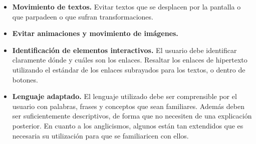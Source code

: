 \begin{itemize}
			\item \textbf{Movimiento de textos.} Evitar textos que se desplacen por la pantalla o que parpadeen o que sufran transformaciones.
			\item \textbf{Evitar animaciones y movimiento de imágenes.}
			\item \textbf{Identificación de elementos interactivos.} El usuario debe identificar claramente dónde y cuáles son los enlaces. Resaltar los enlaces de hipertexto utilizando el estándar de los enlaces subrayados para los textos, o dentro de botones.
			\item \textbf{Lenguaje adaptado.} El lenguaje utilizado debe ser comprensible por el usuario con palabras, frases y conceptos que sean familiares. Además deben ser suficientemente descriptivos, de forma que no necesiten de una explicación posterior. En cuanto a los anglicismos, algunos están tan extendidos que es necesaria su utilización para que se familiaricen con ellos.			
		\end{itemize}
	
	
	
	
	
	
	
